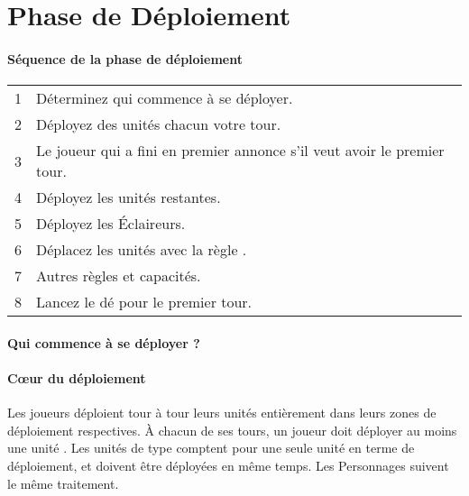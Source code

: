 
\part{Phase de Déploiement}

\subsection{Séquence de la phase de déploiement}

\hspace*{0.3cm}
\begin{tabular}{c|l}
1 & Déterminez qui commence à se déployer. \tabularnewline
2 & Déployez des unités chacun votre tour. \tabularnewline
3 & Le joueur qui a fini en premier annonce s'il veut avoir le premier tour. \tabularnewline
4 & Déployez les unités restantes. \tabularnewline
5 & Déployez les Éclaireurs. \tabularnewline
6 & Déplacez les unités avec la règle \vanguard{}. \tabularnewline
7 & Autres règles et capacités. \tabularnewline
8 & Lancez le dé pour le premier tour. \tabularnewline
\end{tabular}

\subsection{Qui commence à se déployer ?}


\subsection{Cœur du déploiement}

Les joueurs déploient tour à tour leurs unités entièrement dans leurs zones de déploiement respectives. À chacun de ses tours, un joueur doit déployer au moins une unité . Les unités de type \warmachine{} comptent pour une seule unité en terme de déploiement, et doivent être déployées en même temps. Les Personnages suivent le même traitement. 

